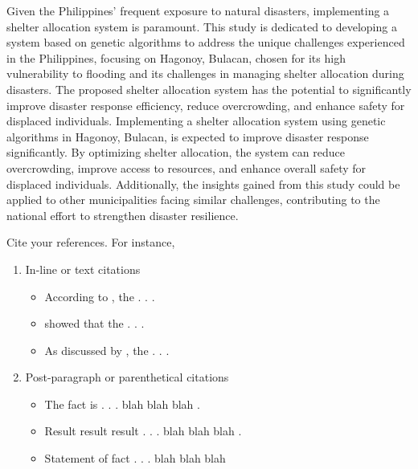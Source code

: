 Given the Philippines' frequent exposure to natural disasters, implementing a shelter allocation system is paramount. This study is dedicated to developing a system based on genetic algorithms to address the unique challenges experienced in the Philippines, focusing on Hagonoy, Bulacan, chosen for its high vulnerability to flooding and its challenges in managing shelter allocation during disasters. The proposed shelter allocation system has the potential to significantly improve disaster response efficiency, reduce overcrowding, and enhance safety for displaced individuals. Implementing a shelter allocation system using genetic algorithms in Hagonoy, Bulacan, is expected to improve disaster response significantly. By optimizing shelter allocation, the system can reduce overcrowding, improve access to resources, and enhance overall safety for displaced individuals. Additionally, the insights gained from this study could be applied to other municipalities facing similar challenges, contributing to the national effort to strengthen disaster resilience.


Cite your references. For instance,
\begin{enumerate}
	\item In-line or text citations
	\begin{itemize}
		\item According to \textcite{BooktagYear}, the . . .
		\item \textcite{JournaltagYear} showed that the . . .
		\item As discussed by \textcite{InbookTagYear}, the . . .
	\end{itemize}
	
	\item Post-paragraph or parenthetical citations
	\begin{itemize}
		\item The fact is . . . blah blah blah \parencite{WebsiteTag}.
		\item Result result result . . . blah blah blah \parencite{ProceedingsTag}.
		\item Statement of fact . . . blah blah blah \parencite{ThesisTag}
	\end{itemize}
\end{enumerate}

